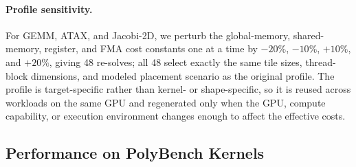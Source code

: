 \paragraph{Profile sensitivity.}
For GEMM, ATAX, and Jacobi-2D, we perturb the global-memory, shared-memory, register, and FMA cost constants one at a time by \(-20\%\), \(-10\%\), \(+10\%\), and \(+20\%\), giving 48 re-solves; all 48 select exactly the same tile sizes, thread-block dimensions, and modeled placement scenario as the original profile. The profile is target-specific rather than kernel- or shape-specific, so it is reused across workloads on the same GPU and regenerated only when the GPU, compute capability, or execution environment changes enough to affect the effective costs.

\subsection{Performance on PolyBench Kernels}
\label{subsec:polybench}

